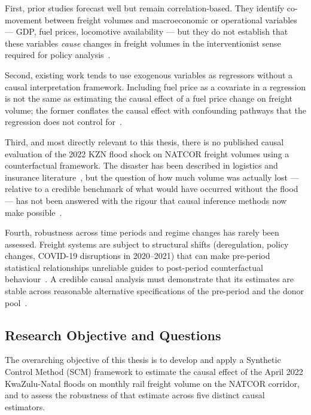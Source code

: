 First, prior studies forecast well but remain correlation-based.
They identify co-movement between freight volumes and macroeconomic
or operational variables --- GDP, fuel prices, locomotive
availability --- but they do not establish that these variables
\emph{cause} changes in freight volumes in the interventionist sense
required for policy analysis~\parencite{pearl2009, granger1969}.

Second, existing work tends to use exogenous variables as regressors
without a causal interpretation framework.
Including fuel price as a covariate in a regression is not the same
as estimating the causal effect of a fuel price change on freight
volume; the former conflates the causal effect with confounding
pathways that the regression does not control
for~\parencite{pearl2009}.

Third, and most directly relevant to this thesis, there is no
published causal evaluation of the 2022 KZN flood shock on NATCOR
freight volumes using a counterfactual framework.
The disaster has been described in logistics and insurance
literature~\parencite{ndmc2022, saaff2022}, but the question of how
much volume was actually lost --- relative to a credible benchmark
of what would have occurred without the flood --- has not been
answered with the rigour that causal inference methods now make
possible~\parencite{abadie2003, abadie2010}.

Fourth, robustness across time periods and regime changes has rarely
been assessed.
Freight systems are subject to structural shifts (deregulation,
policy changes, COVID-19 disruptions in 2020--2021) that can make
pre-period statistical relationships unreliable guides to post-period
counterfactual behaviour~\parencite{havenga2021}.
A credible causal analysis must demonstrate that its estimates are
stable across reasonable alternative specifications of the pre-period
and the donor pool~\parencite{benmichael2021}.

\subsection{Research Objective and Questions}
\label{sec:rq}

The overarching objective of this thesis is to develop and apply a
Synthetic Control Method (SCM) framework to estimate the causal
effect of the April 2022 KwaZulu-Natal floods on monthly rail freight
volume on the NATCOR corridor, and to assess the robustness of that
estimate across five distinct causal estimators.

